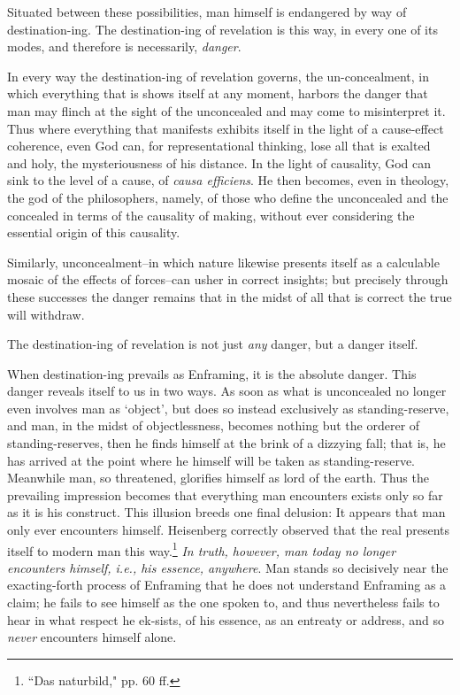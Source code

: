 \documentclass[paper=a4, fontsize=11pt,twoside]{scrartcl}
\begin{document}
Situated between these possibilities, man himself is endangered by way of destination-ing. The destination-ing of revelation is this way, in every one of its modes, and therefore is necessarily, \textit{danger}.

In every way the destination-ing of revelation governs, the un-concealment, in which everything that is shows itself at any moment, harbors the danger that man may flinch at the sight of the unconcealed and may come to misinterpret it. Thus where everything that manifests exhibits itself in the light of a cause-effect coherence, even God can, for representational thinking, lose all that is exalted and holy, the mysteriousness of his distance. In the light of causality, God can sink to the level of a cause, of \textit{causa efficiens}. He then becomes, even in theology, the god of the philosophers, namely, of those who define the unconcealed and the concealed in terms of the causality of making, without ever considering the essential origin of this causality.

Similarly, unconcealment--in which nature likewise presents itself as a calculable mosaic of the effects of forces--can usher in correct insights; but precisely through these successes the danger remains that in the midst of all that is correct the true will withdraw.

The destination-ing of revelation is not just \textit{any} danger, but a danger itself.

When destination-ing prevails as Enframing, it is the absolute danger. This danger reveals itself to us in two ways. As soon as what is unconcealed no longer even involves man as `object', but does so instead exclusively as standing-reserve, and man, in the midst of objectlessness, becomes nothing but the orderer of standing-reserves, then he finds himself at the brink of a dizzying fall; that is, he has arrived at the point where he himself will be taken as standing-reserve. Meanwhile man, so threatened, glorifies himself as lord of the earth. Thus the prevailing impression becomes that everything man encounters exists only so far as it is his construct. This illusion breeds one final delusion: It appears that man only ever encounters himself. Heisenberg correctly observed that the real presents itself to modern man this way.\footnote[2]{``Das naturbild," pp. 60 ff.} \textit{In truth, however, man today no longer encounters himself, i.e., his essence, anywhere}. Man stands so decisively near the exacting-forth process of Enframing that he does not understand Enframing as a claim; he fails to see himself as the one spoken to, and thus nevertheless fails to hear in what respect he ek-sists, of his essence, as an entreaty or address, and so \textit{never} encounters himself alone.
\end{document}
